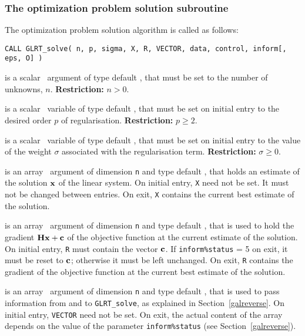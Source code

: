 \documentclass{galahad}
\newcommand{\packagename}{GL\-RT}
\begin{document}

\subsubsection{The optimization problem solution subroutine}
The optimization problem solution algorithm is called as follows:

\hskip0.5in
{\tt CALL \packagename\_solve( n, p, sigma, X, R, VECTOR, data, control, inform[, eps, O] )}

\begin{description}

 is a scalar \intentin\ argument of type default \integer, that must be
set to the number of unknowns, $n$. {\bf Restriction: } $n  >  0$.

 is a scalar \intentin\ variable of type default
\realdp,
that must be set on initial entry to the desired order $p$ of regularisation.
{\bf Restriction: } $p \geq 2$.

 is a scalar \intentin\ variable of type default
\realdp,
that must be set on initial entry
to the value of the weight $\sigma$ associated with the regularisation term.
{\bf Restriction: } $\sigma \geq 0$.

 is an array \intentinout\ argument of dimension {\tt n} and
type default \realdp,
that holds an estimate of the solution ${\mathbf{x}}$ of the linear system.
On initial entry, {\tt X} need not be set.
It must not be changed between entries.
On exit, {\tt X} contains the current best estimate of the solution.

 is an array \intentinout\ argument of dimension {\tt n} and
type default \realdp,
that is used to hold the gradient ${\mathbf{H}} {\mathbf{x}}  +  {\mathbf{c}}$ of the objective
function at the current estimate of the solution.
On initial entry, {\tt R} must contain the vector ${\mathbf{c}}$.
If {\tt inform\%status} = 5 on exit, it must be reset to  ${\mathbf{c}}$; otherwise
it must be left unchanged. On exit, {\tt R} contains the gradient of the
objective   function at the current best estimate of the solution.

 is an array \intentinout\ argument of dimension {\tt n}
and type default \realdp,
that is used to pass information from and to {\tt \packagename\_solve},
as explained in Section~\ref{galreverse}.
On initial entry, {\tt VECTOR} need not be set. On exit, the actual content of
the array depends on the value of the parameter {\tt inform\%status}
(see Section~\ref{galreverse}).


\end{description}
\end{document}
